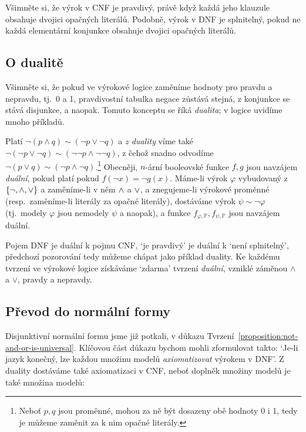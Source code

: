 \begin{observation}
Všimněte si, že výrok v CNF je pravdivý, právě když každá jeho klauzule obsahuje dvojici opačných literálů. Podobně, výrok v DNF je splnitelný, pokud ne každá elementární konjunkce obsahuje dvojici opačných literálů.
\end{observation}

\subsection{O dualitě}

Všimněte si, že pokud ve výrokové logice zaměníme hodnoty pro pravdu a nepravdu, tj.\ 0 a 1, pravdivostní tabulka negace zůstává stejná, z konjunkce se stává disjunkce, a naopak. Tomuto konceptu se říká \emph{dualita}; v logice uvidíme mnoho příkladů. 

Platí $\neg(p\land q)\sim (\neg p\lor \neg q)$ a \emph{z duality} víme také $\neg(\neg p\lor \neg q)\sim (\neg \neg p\land \neg \neg q)$, z čehož snadno odvodíme $\neg(p\lor q)\sim (\neg p\land \neg q)$.\footnote{Neboť $p,q$ jsou proměnné, mohou za ně být dosazeny obě hodnoty 0 i 1, tedy je můžeme zaměnit za k nim opačné literály.} Obecněji, $n$-ární booleovské funkce $f,g$ jsou navzájem \emph{duální}, pokud platí pokud $f(\neg x)=\neg g(x)$. Máme-li výrok $\varphi$ vybudovaný z $\{\neg,{\land},{\lor}\}$ a zaměníme-li v něm ${\land}$ a ${\lor}$, a znegujeme-li výrokové proměnné (resp.\ zaměníme-li literály za opačné literály), dostáváme výrok $\psi\sim\neg\varphi$ (tj.\ modely $\varphi$ jsou nemodely $\psi$ a naopak), a funkce $f_{\varphi,\mathbb P},f_{\psi,\mathbb P}$ jsou navzájem duální.

Pojem DNF je duální k pojmu CNF, `je pravdivý' je duální k `není splnitelný', předchozí pozorování tedy můžeme chápat jako příklad duality. Ke každému tvrzení ve výrokové logice získáváme `zdarma' tvrzení \emph{duální}, vzniklé záměnou $\land$ a $\lor$, pravdy a nepravdy.


\subsection{Převod do normální formy}\label{subsection:convert-to-normal-form}

Disjunktivní normální formu jsme již potkali, v důkazu Tvrzení~\ref{proposition:not-and-or-is-universal}. Klíčovou část důkazu bychom mohli zformulovat takto: `Je-li jazyk konečný, lze každou množinu modelů \emph{axiomatizovat} výrokem v DNF'. Z duality dostáváme také axiomatizaci v CNF, neboť doplněk množiny modelů je také množina modelů:

